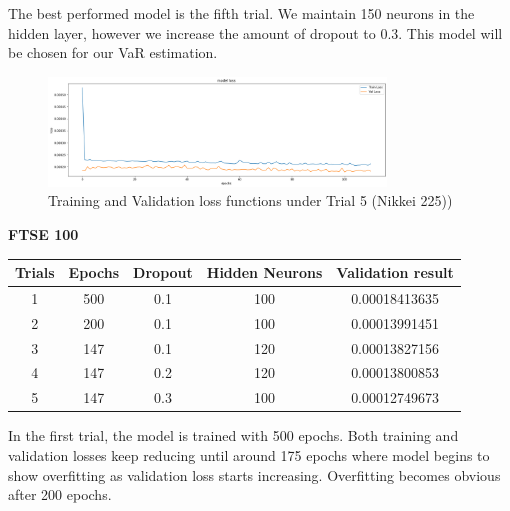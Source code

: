 \documentclass[a4paper,11pt,oneside]{book}
\begin{document}
The best performed model is the fifth trial. We maintain 150 neurons in the hidden layer, however we increase the amount of dropout to 0.3. This model will be chosen for our VaR estimation.\newline
\begin{figure}[!h]
	\centering
	\includegraphics[width=0.8\textwidth]{figures/Nik5}
	\caption{Training and Validation loss functions under Trial 5 (Nikkei 225))}
	\label{Nik5}
\end{figure}
\newline\textbf{FTSE 100}


\begin{center}
	\begin{tabular}{||c c c c c||} 
		\hline
		Trials & Epochs & Dropout & Hidden Neurons & Validation result\\ [0.5ex] 
		\hline\hline
		1 & 500 & 0.1 & 100 & 0.00018413635 \\ 
		\hline
		2 & 200 & 0.1 & 100 & 0.00013991451 \\
		\hline
		3 & 147 & 0.1 & 120 & 0.00013827156 \\
		\hline
		4 & 147 & 0.2 & 120 & 0.00013800853 \\
		\hline
		5 & 147 & 0.3 & 100 & 0.00012749673\\ [1ex] 
		\hline
	\end{tabular}
\end{center}

In the first trial, the model is trained with 500 epochs. Both training and validation losses keep reducing until around 175 epochs where model begins to show overfitting as validation loss starts increasing. Overfitting becomes obvious after 200 epochs.
\end{document}
